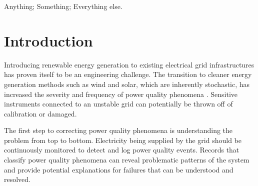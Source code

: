 \documentclass[10pt,conference,compsocconf]{IEEEtran}
\begin{document}




\maketitle


\begin{abstract}

\end{abstract}


\begin{IEEEkeywords}
Anything; Something; Everything else.%
\end{IEEEkeywords}



%
\IEEEpeerreviewmaketitle



\section{Introduction}
Introducing renewable energy generation to existing electrical grid infrastructures has proven itself to be an engineering challenge. The transition to cleaner energy generation methods such as wind and solar, which are inherently stochastic, has increased the severity and frequency of power quality phenomena \cite{Radu:2014:RenewableImpacts}. Sensitive instruments connected to an unstable grid can potentially be thrown off of calibration or damaged.

The first step to correcting power quality phenomena is understanding the problem from top to bottom. Electricity being supplied by the grid should be continuously monitored to detect and log power quality events. Records that classify power quality phenomena can reveal problematic patterns of the system and provide potential explanations for failures that can be understood and resolved. 
\end{document}
